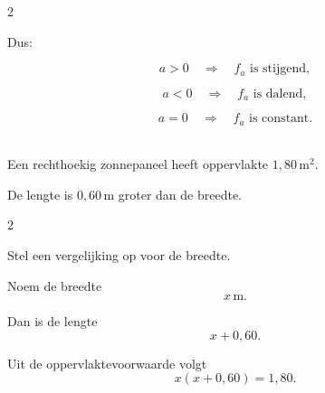 \documentclass{ximera}
\begin{document}
\begin{oefening}{\oefG}
\begin{multicols}{2}
\begin{question}
\begin{oplossing}
    Dus:
    
    \[
    a>0
    \quad\Rightarrow\quad
    f_a \text{ is stijgend},
    \]
    
    \[
    a<0
    \quad\Rightarrow\quad
    f_a \text{ is dalend},
    \]
    
    \[
    a=0
    \quad\Rightarrow\quad
    f_a \text{ is constant}.
    \]
    \end{oplossing}
    \end{question}
    
    \end{multicols}
    
    \end{oefening}
    
    
    \begin{oefening}{\oefG}
    \\
    
    Een rechthoekig zonnepaneel heeft oppervlakte $1{,}80\,\mathrm{m^2}$.
    
    De lengte is $0{,}60\,\mathrm m$ groter dan de breedte.
    
    \begin{center}
    \end{center}
    
    \begin{multicols}{2}
    
    \begin{question}
    Stel een vergelijking op voor de breedte.
    
    \begin{oplossing}
    Noem de breedte
    \[
    x\,\mathrm m.
    \]
    
    Dan is de lengte
    \[
    x+0{,}60.
    \]
    
    Uit de oppervlaktevoorwaarde volgt
    \[
    x(x+0{,}60)=1{,}80.
    \]
    \end{oplossing}
    \end{question}
    

\end{multicols}
\end{oefening}
\end{document}
